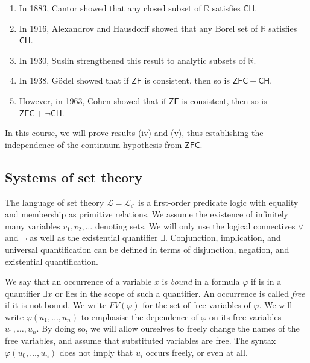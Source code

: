 \begin{enumerate}
    \item In 1883, Cantor showed that any closed subset of \( \mathbb R \) satisfies \( \mathsf{CH} \).
    \item In 1916, Alexandrov and Hausdorff showed that any Borel set of \( \mathbb R \) satisfies \( \mathsf{CH} \).
    \item In 1930, Suslin strengthened this result to analytic subsets of \( \mathbb R \).
    \item In 1938, G\"odel showed that if \( \mathsf{ZF} \) is consistent, then so is \( \mathsf{ZFC} + \mathsf{CH} \).
    \item However, in 1963, Cohen showed that if \( \mathsf{ZF} \) is consistent, then so is \( \mathsf{ZFC} + \neg\mathsf{CH} \).
\end{enumerate}
In this course, we will prove results (iv) and (v), thus establishing the independence of the continuum hypothesis from \( \mathsf{ZFC} \).

\subsection{Systems of set theory}
The language of set theory \( \mathcal L = \mathcal L_\in \) is a first-order predicate logic with equality and membership as primitive relations.
We assume the existence of infinitely many variables \( v_1, v_2, \dots \) denoting sets.
We will only use the logical connectives \( \vee \) and \( \neg \) as well as the existential quantifier \( \exists \).
Conjunction, implication, and universal quantification can be defined in terms of disjunction, negation, and existential quantification.

We say that an occurrence of a variable \( x \) is \emph{bound} in a formula \( \varphi \) if is in a quantifier \( \exists x \) or lies in the scope of such a quantifier.
An occurrence is called \emph{free} if it is not bound.
We write \( FV(\varphi) \) for the set of free variables of \( \varphi \).
We will write \( \varphi(u_1, \dots, u_n) \) to emphasise the dependence of \( \varphi \) on its free variables \( u_1, \dots, u_n \).
By doing so, we will allow ourselves to freely change the names of the free variables, and assume that substituted variables are free.
The syntax \( \varphi(u_0, \dots, u_n) \) does not imply that \( u_i \) occurs freely, or even at all.

